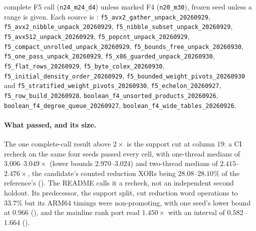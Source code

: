 \begin{table}[t]
{complete F5 call (\texttt{n24\_m24\_d4}) unless marked F4
(\texttt{n20\_m30}), frozen seed unless a range is given. Each source is
: \texttt{f5\_avx2\_gather\_unpack\_20260929},
\texttt{f5\_avx2\_nibble\_unpack\_20260929},
\texttt{f5\_nibble\_subset\_unpack\_20260929},
\texttt{f5\_avx512\_unpack\_20260929}, \texttt{f5\_popcnt\_unpack\_20260929},
\texttt{f5\_compact\_unrolled\_unpack\_20260929},
\texttt{f5\_bounds\_free\_unpack\_20260930},
\texttt{f5\_one\_pass\_unpack\_20260929},
\texttt{f5\_x86\_guarded\_unpack\_20260930}, \texttt{f5\_flat\_rows\_20260929},
\texttt{f5\_byte\_colex\_20260930},
\texttt{f5\_initial\_density\_order\_20260929},
\texttt{f5\_bounded\_weight\_pivots\_20260930} and
\texttt{f5\_stratified\_weight\_pivots\_20260930},
\texttt{f5\_echelon\_20260927}, \texttt{f5\_row\_build\_20260928},
\texttt{boolean\_f4\_unsorted\_products\_20260926},
\texttt{boolean\_f4\_degree\_queue\_20260927},
\texttt{boolean\_f4\_wide\_tables\_20260926}.}
\label{tab:bo-refuted}
\end{table}

\paragraph{What passed, and its size.} The one complete-call result above
$2\times$ is the support cut at column 19: a CI recheck on the same four
seeds passed every cell, with one-thread medians of $3.006$--$3.049\times$
(lower bounds $2.970$--$3.024$) and two-thread medians of $2.415$--$2.476\times$,
the candidate's counted reduction XORs being $28.08$--$28.10\%$ of the
reference's ().
The README calls it a recheck, not an independent second holdout. Its
predecessor, the support split, cut reduction word operations to $33.7\%$
but its ARM64 timings were non-promoting, with one seed's lower bound at
$0.966$ (), and the
mainline rank port read $1.450\times$ with an interval of $0.582$--$1.664$
().

